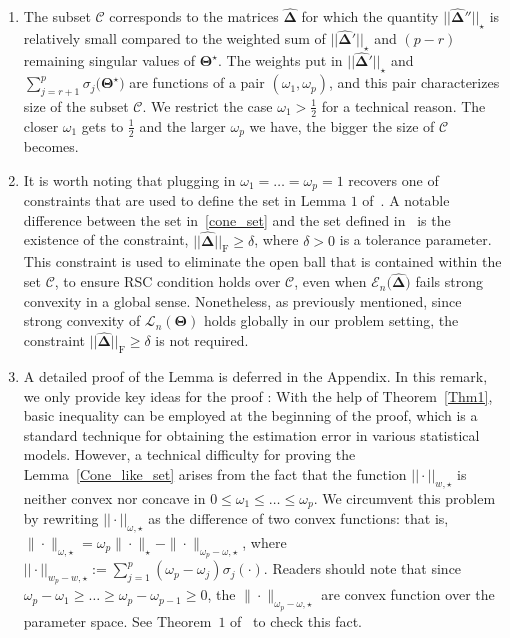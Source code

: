 \documentclass[alpha-refs]{wiley-article}
\begin{document}
\begin{enumerate}
    \item The subset $\mathcal{C}$ corresponds to the matrices $\boldsymbol{\widehat{\Delta}}$ for which the quantity $||\boldsymbol{\widehat{\Delta}}''||_{\star}$ is relatively small compared to the weighted sum of $||\boldsymbol{\widehat{\Delta}}'||_{\star}$ and $(p-r)$ remaining singular values of $\boldsymbol{\Theta}^{\star}$.
    The weights put in $||\boldsymbol{\widehat{\Delta}}'||_{\star}$ and $\sum_{j=r+1}^{p}\sigma_{j}\big(\boldsymbol{\Theta^{\star}}\big)$ are functions of a pair $(\omega_{1},\omega_{p})$, and this pair characterizes size of the subset $\mathcal{C}$.
    We restrict the case $\omega_{1} > \frac{1}{2}$ for a technical reason.
    The closer $\omega_{1}$ gets to $\frac{1}{2}$ and the larger $\omega_{p}$ we have, the bigger the size of $\mathcal{C}$  becomes.
    
    \item It is worth noting that plugging in $\omega_{1}=\dots=\omega_{p}=1$ recovers one of constraints that are used to define the set in Lemma $1$ of~\citet{negahban2011estimation}.
    A notable difference between the set in~\eqref{cone_set} and the set defined in~\citet{negahban2011estimation} is the existence of the constraint, $||\boldsymbol{\widehat{\Delta}}||_{\text{F}} \geq \delta$, where $\delta>0$ is a tolerance parameter.
    This constraint is used to eliminate the open ball that is contained within the set $\mathcal{C}$, to ensure RSC condition holds over $\mathcal{C}$, even when $\mathcal{E}_{n}\big(\boldsymbol{\widehat{\Delta}})$ fails strong convexity in a global sense. 
    Nonetheless, as previously mentioned, since strong convexity of $\mathcal{L}_{n}(\boldsymbol{\Theta})$ holds globally in our problem setting, the constraint $||\boldsymbol{\widehat{\Delta}}||_{\text{F}} \geq \delta$ is not required.
    
    \item A detailed proof of the Lemma is deferred in the Appendix.
    In this remark, we only provide key ideas for the proof :
    With the help of Theorem~\ref{Thm1}, basic inequality can be employed at the beginning of the proof,
    which is a standard technique for obtaining the estimation error in various statistical models.
    However, a technical difficulty for proving the Lemma~\ref{Cone_like_set} arises from the fact that the function $|| \cdot ||_{w,\star}$ is neither convex nor concave in $0\leq \omega_{1}\leq\dots \leq \omega_{p}$.
    We circumvent this problem by rewriting $|| \cdot ||_{\omega,\star}$ as the difference of two convex functions: that is,  
    $\| \cdot \|_{\omega,\star} = \omega_{p} \| \cdot \|_{\star} - \| \cdot \|_{\omega_{p}-\omega,\star}$,
    where $|| \cdot ||_{w_{p}-w,\star}:=\sum_{j=1}^{p}(\omega_{p}-\omega_{j})\sigma_{j}(\cdot)$.
    Readers should note that since $\omega_{p}-\omega_{1} \geq \dots \geq \omega_{p}-\omega_{p-1}\geq 0$, the $\| \cdot \|_{\omega_{p}-\omega,\star}$ are convex function over the parameter space.
    See Theorem~$1$ of~\cite{chen2013reduced} to check this fact.
\end{enumerate}
\end{document}
